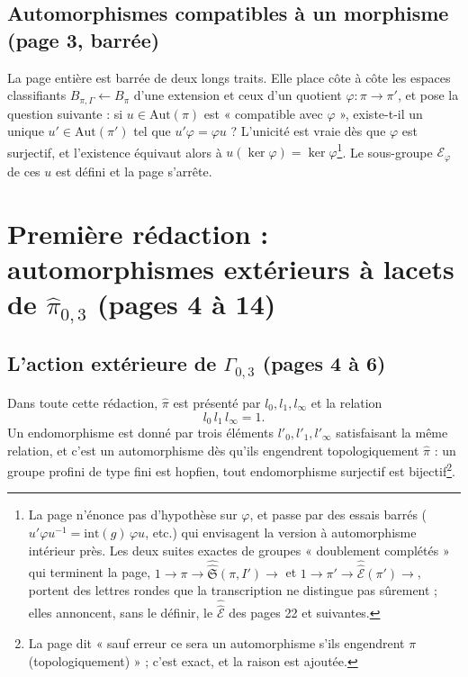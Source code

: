 \documentclass[11pt,a4paper]{article}
\begin{document}
\subsection*{Automorphismes compatibles à un morphisme (page 3, barrée)}

La page entière est barrée de deux longs traits. Elle place côte à côte les
espaces classifiants $B_{\pi,\Gamma} \leftarrow B_\pi$ d'une extension et
ceux d'un quotient $\varphi : \pi \to \pi'$, et pose la question suivante : si
$u \in \mathrm{Aut}(\pi)$ est « compatible avec $\varphi$ », existe-t-il un unique
$u' \in \mathrm{Aut}(\pi')$ tel que $u' \varphi = \varphi u$ ? L'unicité est
vraie dès que $\varphi$ est surjectif, et l'existence équivaut alors à
$u(\ker \varphi) = \ker \varphi$\footnote{La page n'énonce pas d'hypothèse sur
$\varphi$, et passe par des essais barrés ($u' \varphi u^{-1} =
\mathrm{int}(g)\,\varphi u$, etc.) qui envisagent la version à automorphisme
intérieur près. Les deux suites exactes de groupes « doublement complétés » qui
terminent la page, $1 \to \pi \to \hat{\hat{\mathfrak{S}}}(\pi, I') \to$ et $1 \to
\pi' \to \hat{\hat{\mathcal{E}}}(\pi') \to$, portent des lettres rondes que la
transcription ne distingue pas sûrement ; elles annoncent, sans le définir, le
$\hat{\hat{\mathcal{E}}}$ des pages 22 et suivantes.}. Le sous-groupe
$\mathcal{E}_\varphi$ de ces $u$ est défini et la page s'arrête.

\section*{Première rédaction : automorphismes extérieurs à lacets de
$\widehat{\pi}_{0,3}$ (pages 4 à 14)}

\subsection*{L'action extérieure de $\Gamma_{0,3}$ (pages 4 à 6)}

Dans toute cette rédaction, $\widehat{\pi}$ est présenté par $l_0, l_1,
l_\infty$ et la relation
\[
l_0\, l_1\, l_\infty = 1 .
\]
Un endomorphisme est donné par trois éléments $l'_0, l'_1, l'_\infty$
satisfaisant la même relation, et c'est un automorphisme dès qu'ils engendrent
topologiquement $\widehat{\pi}$ : un groupe profini de type fini est hopfien,
tout endomorphisme surjectif est bijectif\footnote{La page dit « sauf erreur ce
sera un automorphisme s'ils engendrent $\pi$ (topologiquement) » ; c'est exact,
et la raison est ajoutée.}.
\end{document}

